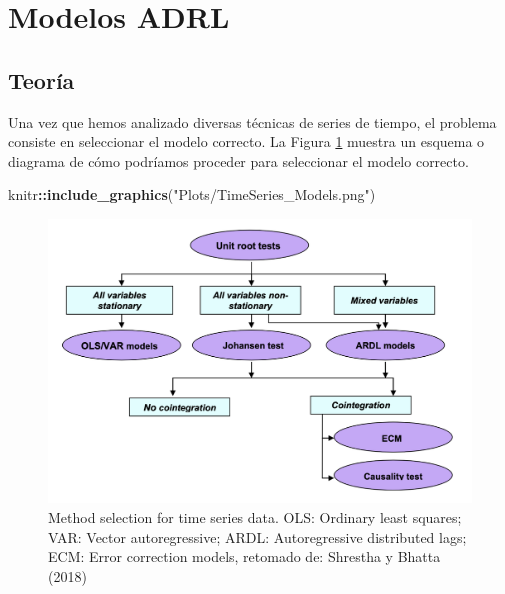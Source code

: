 \documentclass[
]{book}
\newenvironment{Shaded}{\begin{snugshade}}{\end{snugshade}}
\newcommand{\FunctionTok}[1]{\textcolor[rgb]{0.13,0.29,0.53}{\textbf{#1}}}
\newcommand{\NormalTok}[1]{#1}
\newcommand{\SpecialCharTok}[1]{\textcolor[rgb]{0.81,0.36,0.00}{\textbf{#1}}}
\newcommand{\StringTok}[1]{\textcolor[rgb]{0.31,0.60,0.02}{#1}}
\begin{document}
\hypertarget{modelos-adrl}{%
\section{Modelos ADRL}\label{modelos-adrl}}

\hypertarget{teoruxeda}{%
\subsection{Teoría}\label{teoruxeda}}

Una vez que hemos analizado diversas técnicas de series de tiempo, el problema consiste en seleccionar el modelo correcto. La Figura \ref{fig:fig91} muestra un esquema o diagrama de cómo podríamos proceder para seleccionar el modelo correcto.

\begin{Shaded}
\begin{Highlighting}[]
\NormalTok{knitr}\SpecialCharTok{::}\FunctionTok{include\_graphics}\NormalTok{(}\StringTok{"Plots/TimeSeries\_Models.png"}\NormalTok{) }
\end{Highlighting}
\end{Shaded}

\begin{figure}

{\centering \includegraphics[width=0.95\linewidth]{Plots/TimeSeries_Models} 

}

\caption{Method selection for time series data. OLS: Ordinary least squares; VAR: Vector autoregressive; ARDL: Autoregressive distributed lags; ECM: Error correction models, retomado de: Shrestha y Bhatta (2018)}\label{fig:fig91}
\end{figure}
\end{document}
